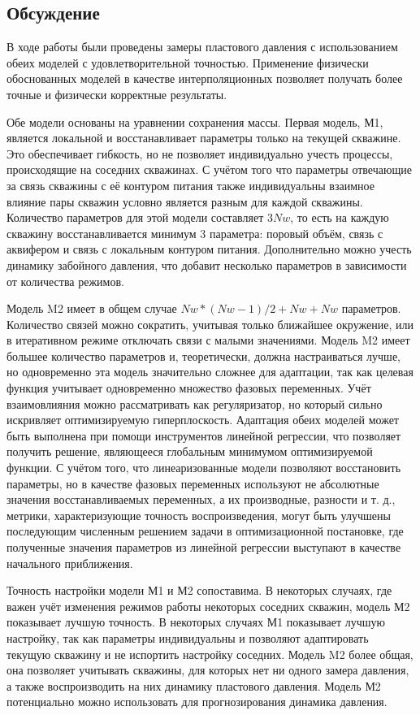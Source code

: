 \documentclass[14pt]{article}
\begin{document}
\subsection{Обсуждение}
В ходе работы были проведены замеры пластового давления с использованием обеих моделей с удовлетворительной точностью. Применение физически обоснованных моделей в качестве интерполяционных позволяет получать более точные и физически корректные результаты.

Обе модели основаны на уравнении сохранения массы. Первая модель, М1, является локальной и восстанавливает параметры только на текущей скважине. Это обеспечивает гибкость, но не позволяет индивидуально учесть процессы, происходящие на соседних скважинах. С учётом того что параметры отвечающие за связь скважины с её контуром питания также индивидуальны взаимное влияние пары скважин условно является разным для каждой скважины. Количество параметров для этой модели составляет $3Nw$, то есть на каждую скважину восстанавливается минимум 3 параметра: поровый объём, связь с аквифером и связь с локальным контуром питания. Дополнительно можно учесть динамику забойного давления, что добавит несколько параметров в зависимости от количества режимов.

Модель M2 имеет в общем случае $Nw*(Nw-1)/2 + Nw + Nw$ параметров. Количество связей можно сократить, учитывая только ближайшее окружение, или в итеративном режиме отключать связи с малыми значениями.
Модель M2 имеет большее количество параметров и, теоретически, должна настраиваться лучше, но одновременно эта модель значительно сложнее для адаптации, так как целевая функция учитывает одновременно множество фазовых переменных.
Учёт взаимовлияния можно рассматривать как регуляризатор, но который сильно искривляет оптимизируемую гиперплоскость.
Адаптация обеих моделей может быть выполнена при помощи инструментов линейной регрессии, что позволяет получить решение, являющееся глобальным минимумом оптимизируемой функции.
С учётом того, что линеаризованные модели позволяют восстановить параметры, но в качестве фазовых переменных используют не абсолютные значения восстанавливаемых переменных, а их производные, разности и т. д., метрики, характеризующие точность воспроизведения, могут быть улучшены последующим численным решением задачи в оптимизационной постановке, где полученные значения параметров из линейной регрессии выступают в качестве начального приближения.

Точность настройки модели М1 и М2 сопоставима. В некоторых случаях, где важен учёт изменения режимов работы некоторых соседних скважин, модель М2 показывает лучшую точность. В некоторых случаях М1 показывает лучшую настройку, так как параметры индивидуальны и позволяют адаптировать текущую скважину и не испортить настройку соседних. Модель M2 более общая, она позволяет учитывать скважины, для которых нет ни одного замера давления, а также воспроизводить на них динамику пластового давления. Модель М2 потенциально можно использовать для прогнозирования динамика давления.  
\end{document}

